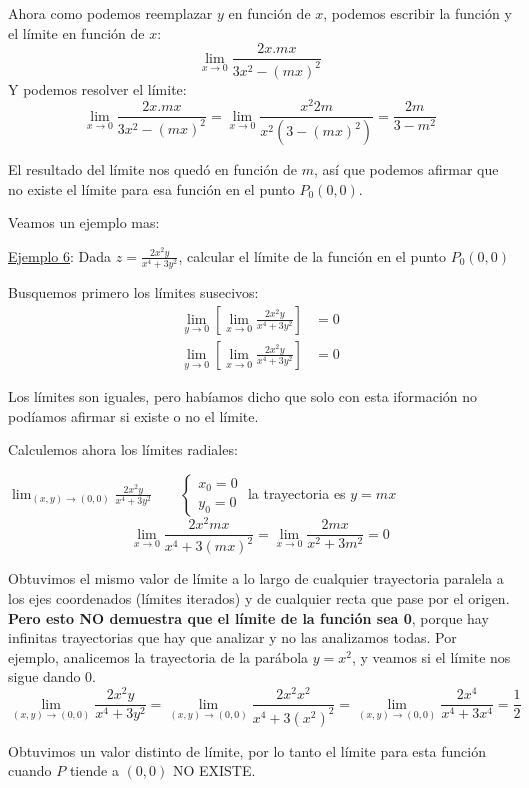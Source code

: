 \documentclass[12pt]{article}
\begin{document}
Ahora como podemos reemplazar $ y $ en función de $ x $, podemos escribir la función y el límite en función de $ x $:
\[
\lim_{x \to 0}{\frac{2x.mx}{3x^{2} - (mx)^{2}}}
\]
Y podemos resolver el límite:
\[
\lim_{x \to 0}{\frac{2x.mx}{3x^{2} - (mx)^{2}}} = \lim_{x \to 0}{\frac{x^{2}2m}{x^{2}(3- (mx)^{2})}} = \frac{2m}{3-m^{2}}
\]

El resultado del límite nos quedó en función de $ m $, así que podemos afirmar que no existe el límite para esa función en el punto $ P_{0}(0,0) $.

Veamos un ejemplo mas:

\underline{Ejemplo 6}:
Dada $ z = \frac{2x^{2}y}{x^{4}+3y^{2}} $, calcular el límite de la función en el punto $ P_{0}(0,0) $

Busquemos primero los límites susecivos:
\begin{align*}
	\lim_{y \to 0}{\left[\lim_{x \to 0}{\frac{2x^{2}y}{x^{4}+3y^{2}}}\right]} &= 0 \\
	\lim_{y \to 0}{\left[\lim_{x \to 0}{\frac{2x^{2}y}{x^{4}+3y^{2}}}\right]} &= 0
\end{align*}

Los límites son iguales, pero habíamos dicho que solo con esta iformación no podíamos afirmar si existe o no el límite.

Calculemos ahora los límites radiales:
 
$
\displaystyle \lim_{(x,y) \to (0,0)}{\frac{2x^{2}y}{x^{4}+3y^{2}}}
\qquad
\begin{cases}
  x_{0} = 0 \\
  y_{0} = 0
\end{cases}
$ la trayectoria es $ y = mx $
\[
\lim_{x \to 0}{\frac{2x^{2}mx}{x^{4}+3(mx)^{2}}} = \lim_{x \to 0}{\frac{2mx}{x^{2}+3m^{2}}} = 0
\]

Obtuvimos el mismo valor de límite a lo largo de cualquier trayectoria paralela a los ejes coordenados (límites iterados) y de cualquier recta que pase por el origen. \textbf{Pero esto NO demuestra que el límite de la función sea 0}, porque hay infinitas trayectorias que hay que analizar y no las analizamos todas. Por ejemplo, analicemos la trayectoria de la parábola $ y = x^{2} $, y veamos si el límite nos sigue dando 0.
\[
	\lim_{(x,y) \to (0,0)}{\frac{2x^{2}y}{x^{4}+3y^{2}}} =\lim_{(x,y) \to (0,0)}{\frac{2x^{2}x^{2}}{x^{4}+3(x^{2})^{2}}} = \lim_{(x,y) \to (0,0)}{\frac{2x^{4}}{x^{4}+3x^{4}}} = \frac{1}{2}
\]

Obtuvimos un valor distinto de límite, por lo tanto el límite para esta función cuando $ P $ tiende a $ (0,0) $ NO EXISTE.
\end{document}
